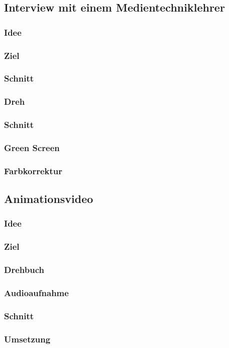 \subsection{Interview mit einem Medientechniklehrer}
\subsubsection{Idee}
\subsubsection{Ziel}
\subsubsection{Schnitt}
\subsubsection{Dreh}
\subsubsection{Schnitt}
\subsubsection{Green Screen}
\subsubsection{Farbkorrektur}
\subsection{Animationsvideo}
\subsubsection{Idee}
\subsubsection{Ziel}
\subsubsection{Drehbuch}
\subsubsection{Audioaufnahme}
\subsubsection{Schnitt}
\subsubsection{Umsetzung}